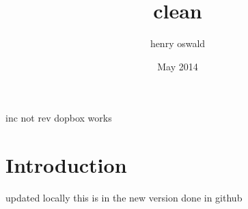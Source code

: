 \documentclass{article}
\title{clean}
\author{henry oswald}
\date{May 2014}
\begin{document}
\maketitle
inc not rev
dopbox works
\section{Introduction}
updated locally
this is in the new version 
done in github
\end{document}
